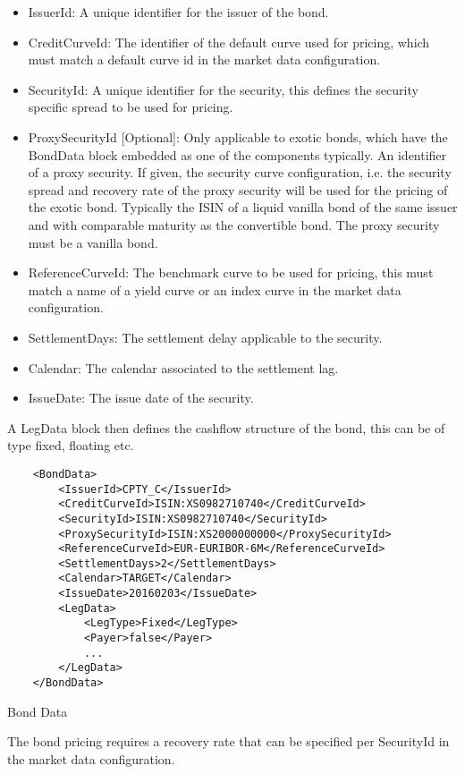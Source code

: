 \begin{itemize}
\item IssuerId: A unique identifier for the issuer of the bond.
\item CreditCurveId: The identifier of the default curve used for pricing, which must
match a default curve id in the market data configuration.
\item SecurityId: A unique identifier for the security, this defines the security specific spread to be used for pricing.
\item ProxySecurityId [Optional]: Only applicable to exotic bonds, which have the BondData block embedded as one of the
  components typically. An identifier of a proxy security. If given, the security curve configuration, i.e. the security
  spread and recovery rate of the proxy security will be used for the pricing of the exotic bond. Typically the ISIN of
  a liquid vanilla bond of the same issuer and with comparable maturity as the convertible bond. The proxy security must
  be a vanilla bond.
\item ReferenceCurveId: The benchmark curve to be used for pricing, this must match a name of a yield curve or an index curve in the market data configuration.
\item SettlementDays: The settlement delay applicable to the security.
\item Calendar: The calendar associated to the settlement lag.
\item IssueDate: The issue date of the security.
\end{itemize}

A LegData block then defines the cashflow structure of the bond, this can be of type fixed, floating etc.

\begin{listing}[H]
\begin{verbatim}
    <BondData>
        <IssuerId>CPTY_C</IssuerId>
        <CreditCurveId>ISIN:XS0982710740</CreditCurveId>
        <SecurityId>ISIN:XS0982710740</SecurityId>
        <ProxySecurityId>ISIN:XS2000000000</ProxySecurityId>
        <ReferenceCurveId>EUR-EURIBOR-6M</ReferenceCurveId>
        <SettlementDays>2</SettlementDays>
        <Calendar>TARGET</Calendar>
        <IssueDate>20160203</IssueDate>
        <LegData>
            <LegType>Fixed</LegType>
            <Payer>false</Payer>
            ...
        </LegData>
    </BondData>
\end{verbatim}
\caption{Bond Data}
\label{lst:bonddata}
\end{listing}

The bond pricing requires a recovery rate that can be specified per SecurityId in the market data configuration.